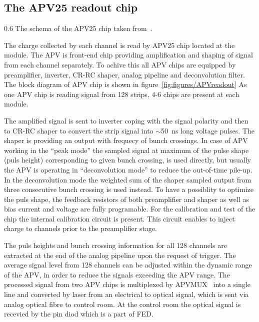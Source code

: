 

\subsection{The APV25 readout chip \label{sec:APV}}


                 {0.6}       %
                 {The schema of the APV25 chip taken from~\cite{Friedl:2001kra}.} %

The charge collected by each channel is read by APV25 chip located at the module. The APV is front-end chip providing amplification and shaping of signal from each channel separately. To achive this all APV chips are equipped by preamplifier, inverter, CR-RC shaper, analog pipeline and deconvolution filter. The block diagram of APV chip is shown in figure~\ref{fig:figures/APVreadout} As one APV chip is reading signal from 128 strips, 4-6 chips are present at each module.

The amplified signal is sent to inverter coping with the signal polarity and then to CR-RC shaper to convert the strip signal into $\sim$50~ns long voltage pulses. The shaper is providing an output with frequecy of bunch crossings. In case of APV working in the ``peak mode'' the sampled signal at maximum of the pulse shape (puls height) corresponding to given bunch crossing, is used directly, but usually the APV is operating in ``deconvolution mode'' to reduce the out-of-time pile-up. In the deconvolution mode the weighted sum of the shaper sampled output from three consecutive bunch crossing is used instead. To have a possiblity to optimize the puls shape, the feedback resistors of both preamplifier and shaper as well as  bias current and voltage are fully programable. For the calibration and test of the chip the internal calibration circuit is present. This circuit enables to inject charge to channels prior to the preamplifier stage.

The puls heights and bunch crossing information for all 128 channels are extracted at the end of the analog pipeline upon the request of trigger. The average signal level from 128 channels can be adjusted within the dynamic range of the APV, in order to reduce the signals exceeding the APV range. The processed signal from two APV chips is multiplexed by APVMUX~\cite{Ball:2007zza} into a single line and converted by laser from an electrical to optical signal, which is sent via analog optical fibre to control room. At the control room the optical signal is recevied by the pin diod which is a part of FED.

